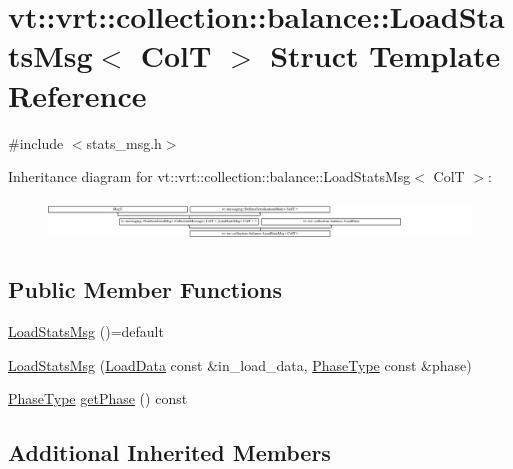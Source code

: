 \hypertarget{structvt_1_1vrt_1_1collection_1_1balance_1_1_load_stats_msg}{}\section{vt\+:\+:vrt\+:\+:collection\+:\+:balance\+:\+:Load\+Stats\+Msg$<$ ColT $>$ Struct Template Reference}
\label{structvt_1_1vrt_1_1collection_1_1balance_1_1_load_stats_msg}


{\ttfamily \#include $<$stats\+\_\+msg.\+h$>$}

Inheritance diagram for vt\+:\+:vrt\+:\+:collection\+:\+:balance\+:\+:Load\+Stats\+Msg$<$ ColT $>$\+:\begin{figure}[H]
\begin{center}
\leavevmode
\includegraphics[height=1.070746cm]{structvt_1_1vrt_1_1collection_1_1balance_1_1_load_stats_msg}
\end{center}
\end{figure}
\subsection*{Public Member Functions}
\begin{DoxyCompactItemize}
\item 
\hyperlink{structvt_1_1vrt_1_1collection_1_1balance_1_1_load_stats_msg_acb37915875685edfc80d6282cd493a58}{Load\+Stats\+Msg} ()=default
\item 
\hyperlink{structvt_1_1vrt_1_1collection_1_1balance_1_1_load_stats_msg_a070605d1d3f9a70f7a8681d0f5fc827b}{Load\+Stats\+Msg} (\hyperlink{structvt_1_1vrt_1_1collection_1_1balance_1_1_load_data}{Load\+Data} const \&in\+\_\+load\+\_\+data, \hyperlink{namespacevt_a46ce6733d5cdbd735d561b7b4029f6d7}{Phase\+Type} const \&phase)
\item 
\hyperlink{namespacevt_a46ce6733d5cdbd735d561b7b4029f6d7}{Phase\+Type} \hyperlink{structvt_1_1vrt_1_1collection_1_1balance_1_1_load_stats_msg_acfce435d77d32952996e334701fe28ed}{get\+Phase} () const
\end{DoxyCompactItemize}
\subsection*{Additional Inherited Members}


